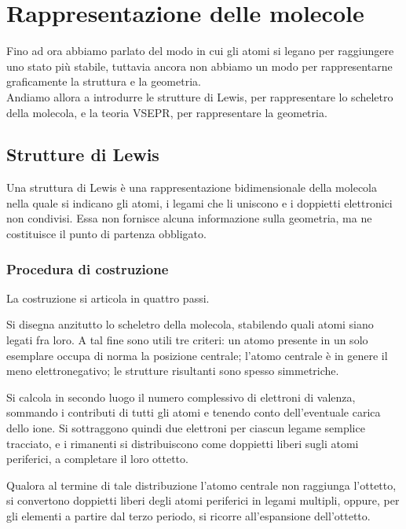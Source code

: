 \chapter{Rappresentazione delle molecole}

Fino ad ora abbiamo parlato del modo in cui gli atomi si legano per raggiungere uno stato più stabile, tuttavia ancora non abbiamo un modo per rappresentarne graficamente la struttura e la geometria. \\

Andiamo allora a introdurre le strutture di Lewis, per rappresentare lo scheletro della molecola, e la teoria VSEPR, per rappresentare la geometria. 

\section{Strutture di Lewis}

Una struttura di Lewis è una rappresentazione bidimensionale della molecola nella quale si indicano gli atomi, i legami che li uniscono e i doppietti elettronici non condivisi. Essa non fornisce alcuna informazione sulla geometria, ma ne costituisce il punto di partenza obbligato.

\subsection{Procedura di costruzione}

La costruzione si articola in quattro passi.

Si disegna anzitutto lo scheletro della molecola, stabilendo quali atomi siano legati fra loro. A tal fine sono utili tre criteri: un atomo presente in un solo esemplare occupa di norma la posizione centrale; l'atomo centrale è in genere il meno elettronegativo; le strutture risultanti sono spesso simmetriche.

Si calcola in secondo luogo il numero complessivo di elettroni di valenza, sommando i contributi di tutti gli atomi e tenendo conto dell'eventuale carica dello ione. Si sottraggono quindi due elettroni per ciascun legame semplice tracciato, e i rimanenti si distribuiscono come doppietti liberi sugli atomi periferici, a completare il loro ottetto.

Qualora al termine di tale distribuzione l'atomo centrale non raggiunga l'ottetto, si convertono doppietti liberi degli atomi periferici in legami multipli, oppure, per gli elementi a partire dal terzo periodo, si ricorre all'espansione dell'ottetto.\\

